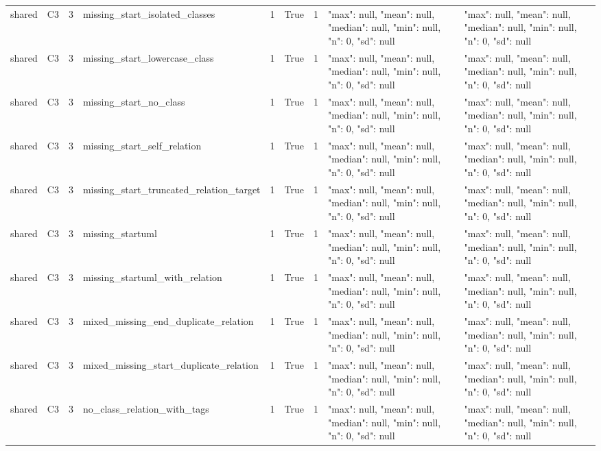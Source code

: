 \begin{tabular}{lllllllll}
shared & C3 & 3 & missing\_start\_isolated\_classes & 1 & True & 1 & {"max": null, "mean": null, "median": null, "min": null, "n": 0, "sd": null} & {"max": null, "mean": null, "median": null, "min": null, "n": 0, "sd": null} \\
shared & C3 & 3 & missing\_start\_lowercase\_class & 1 & True & 1 & {"max": null, "mean": null, "median": null, "min": null, "n": 0, "sd": null} & {"max": null, "mean": null, "median": null, "min": null, "n": 0, "sd": null} \\
shared & C3 & 3 & missing\_start\_no\_class & 1 & True & 1 & {"max": null, "mean": null, "median": null, "min": null, "n": 0, "sd": null} & {"max": null, "mean": null, "median": null, "min": null, "n": 0, "sd": null} \\
shared & C3 & 3 & missing\_start\_self\_relation & 1 & True & 1 & {"max": null, "mean": null, "median": null, "min": null, "n": 0, "sd": null} & {"max": null, "mean": null, "median": null, "min": null, "n": 0, "sd": null} \\
shared & C3 & 3 & missing\_start\_truncated\_relation\_target & 1 & True & 1 & {"max": null, "mean": null, "median": null, "min": null, "n": 0, "sd": null} & {"max": null, "mean": null, "median": null, "min": null, "n": 0, "sd": null} \\
shared & C3 & 3 & missing\_startuml & 1 & True & 1 & {"max": null, "mean": null, "median": null, "min": null, "n": 0, "sd": null} & {"max": null, "mean": null, "median": null, "min": null, "n": 0, "sd": null} \\
shared & C3 & 3 & missing\_startuml\_with\_relation & 1 & True & 1 & {"max": null, "mean": null, "median": null, "min": null, "n": 0, "sd": null} & {"max": null, "mean": null, "median": null, "min": null, "n": 0, "sd": null} \\
shared & C3 & 3 & mixed\_missing\_end\_duplicate\_relation & 1 & True & 1 & {"max": null, "mean": null, "median": null, "min": null, "n": 0, "sd": null} & {"max": null, "mean": null, "median": null, "min": null, "n": 0, "sd": null} \\
shared & C3 & 3 & mixed\_missing\_start\_duplicate\_relation & 1 & True & 1 & {"max": null, "mean": null, "median": null, "min": null, "n": 0, "sd": null} & {"max": null, "mean": null, "median": null, "min": null, "n": 0, "sd": null} \\
shared & C3 & 3 & no\_class\_relation\_with\_tags & 1 & True & 1 & {"max": null, "mean": null, "median": null, "min": null, "n": 0, "sd": null} & {"max": null, "mean": null, "median": null, "min": null, "n": 0, "sd": null} \\

\end{tabular}
